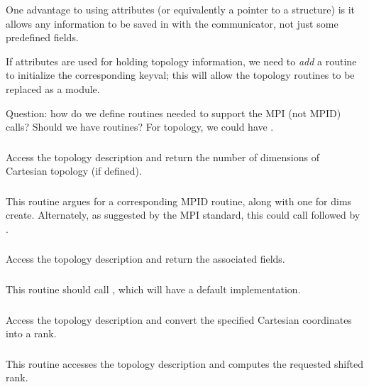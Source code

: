 \documentclass{article}
\begin{document}
One advantage to using attributes (or equivalently a pointer to a
structure) is it allows any information to be saved in with the
communicator, not just some predefined fields.  

If attributes are used for holding topology information, we need to
\emph{add} a routine to initialize the corresponding keyval; this will
allow the topology routines to be replaced as a module.

Question: how do we define routines needed to support the MPI (not
MPID) calls?  Should we have  routines?  For topology, we
could have .

\subsubsection{}
Access the topology description and return the number of dimensions of
Cartesian topology (if defined).

\subsubsection{}
This routine argues for a corresponding MPID routine, along with one for dims
create. Alternately, as suggested by the MPI standard, this could call
 followed by .

\subsubsection{}
Access the topology description and return the associated fields.

\subsubsection{}
This routine should call , which will have a default
implementation.  

\subsubsection{}
Access the topology description and convert the specified Cartesian
coordinates into a rank.

\subsubsection{}
This routine accesses the topology description and computes the requested
shifted rank.
\end{document}
